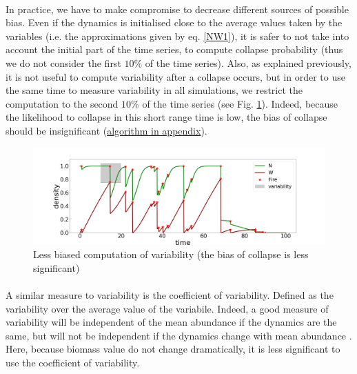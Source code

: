 \documentclass{article}
\begin{document}
\paragraph{}
In practice, we have to make compromise to decrease different sources of possible bias. Even if the dynamics is initialised close to the average values taken by the variables (i.e. the approximations given by eq. \ref{NW1}), it is safer to not take into account the initial part of the time series, to compute collapse probability (thus we do not consider the first $10\%$ of the time series). Also, as explained previously, it is not useful to compute variability after a collapse occurs, but in order to use the same time to measure variability in all simulations, we restrict the computation to the second $10\%$ of the time series (see Fig. \ref{fig:variability2}). Indeed, because the likelihood to collapse in this short range time is low, the bias of collapse should be insignificant (\hyperref[algo_variability]{algorithm in appendix}). %

\begin{figure}[h!]
\centering
\includegraphics[width=12.cm]{time_series_sd_2.png}
\caption{Less biased computation of variability (the bias of collapse is less significant)
\label{fig:variability2} 
}
\end{figure}


\paragraph{}
A similar measure to variability is the coefficient of variability. Defined as the variability over the average value of the variabile. Indeed, a good measure of variability will be independent of the mean abundance if the dynamics are the same, but will not be independent if the dynamics change with mean abundance \citep{gaston_measurement_1993, noauthor_temporal_1994}. Here, because biomass value do not change dramatically, it is less significant to use the coefficient of variability.
\end{document}

